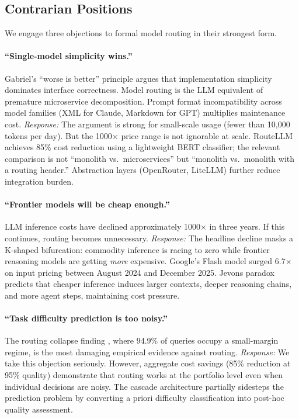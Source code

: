 \subsection{Contrarian Positions}

We engage three objections to formal model routing in their strongest form.

\paragraph{``Single-model simplicity wins.''} Gabriel's ``worse is better'' principle \citep{gabriel1989} argues that implementation simplicity dominates interface correctness. Model routing is the LLM equivalent of premature microservice decomposition. Prompt format incompatibility across model families (XML for Claude, Markdown for GPT) multiplies maintenance cost. \emph{Response:} The argument is strong for small-scale usage (fewer than 10,000 tokens per day). But the 1000$\times$ price range is not ignorable at scale. RouteLLM achieves 85\% cost reduction using a lightweight BERT classifier; the relevant comparison is not ``monolith vs.\ microservices'' but ``monolith vs.\ monolith with a routing header.'' Abstraction layers (OpenRouter, LiteLLM) further reduce integration burden.

\paragraph{``Frontier models will be cheap enough.''} LLM inference costs have declined approximately 1000$\times$ in three years. If this continues, routing becomes unnecessary. \emph{Response:} The headline decline masks a K-shaped bifurcation: commodity inference is racing to zero while frontier reasoning models are getting \emph{more} expensive. Google's Flash model surged 6.7$\times$ on input pricing between August 2024 and December 2025. Jevons paradox predicts that cheaper inference induces larger contexts, deeper reasoning chains, and more agent steps, maintaining cost pressure.

\paragraph{``Task difficulty prediction is too noisy.''} The routing collapse finding \citep{routingcollapse2026}, where 94.9\% of queries occupy a small-margin regime, is the most damaging empirical evidence against routing. \emph{Response:} We take this objection seriously. However, aggregate cost savings (85\% reduction at 95\% quality) demonstrate that routing works at the portfolio level even when individual decisions are noisy. The cascade architecture partially sidesteps the prediction problem by converting a priori difficulty classification into post-hoc quality assessment.

